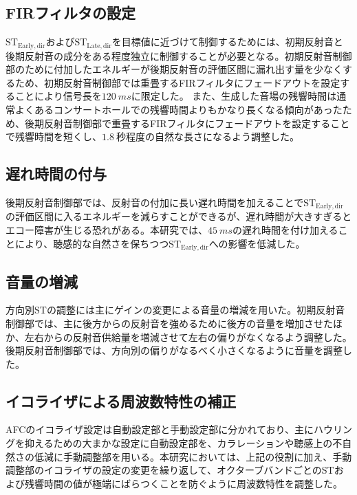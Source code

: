 \documentclass[11pt,a4j]{jreport}
\begin{document}
\subsection*{FIRフィルタの設定}
$\mathrm{ST_{Early,dir}}$および$\mathrm{ST_{Late,dir}}$を目標値に近づけて制御するためには、初期反射音と後期反射音の成分をある程度独立に制御することが必要となる。初期反射音制御部のために付加したエネルギーが後期反射音の評価区間に漏れ出す量を少なくするため、初期反射音制御部では重畳するFIRフィルタにフェードアウトを設定することにより信号長を$\SI{120}{ms}$に限定した。
また、生成した音場の残響時間は通常よくあるコンサートホールでの残響時間よりもかなり長くなる傾向があったため、後期反射音制御部で重畳するFIRフィルタにフェードアウトを設定することで残響時間を短くし、$\SI{1.8}{秒}$程度の自然な長さになるよう調整した。
  
\subsection*{遅れ時間の付与}
後期反射音制御部では、反射音の付加に長い遅れ時間を加えることで$\mathrm{ST_{Early,dir}}$の評価区間に入るエネルギーを減らすことができるが、遅れ時間が大きすぎるとエコー障害が生じる恐れがある。本研究では、$\SI{45}{ms}$の遅れ時間を付け加えることにより、聴感的な自然さを保ちつつ$\mathrm{ST_{Early,dir}}$への影響を低減した。

\subsection*{音量の増減}
方向別STの調整には主にゲインの変更による音量の増減を用いた。初期反射音制御部では、主に後方からの反射音を強めるために後方の音量を増加させたほか、左右からの反射音供給量を増減させて左右の偏りがなくなるよう調整した。後期反射音制御部では、方向別の偏りがなるべく小さくなるように音量を調整した。

\subsection*{イコライザによる周波数特性の補正}
AFCのイコライザ設定は自動設定部と手動設定部に分かれており、主にハウリングを抑えるための大まかな設定に自動設定部を、カラレーションや聴感上の不自然さの低減に手動調整部を用いる。本研究においては、上記の役割に加え、手動調整部のイコライザの設定の変更を繰り返して、オクターブバンドごとのSTおよび残響時間の値が極端にばらつくことを防ぐように周波数特性を調整した。

\end{document}
